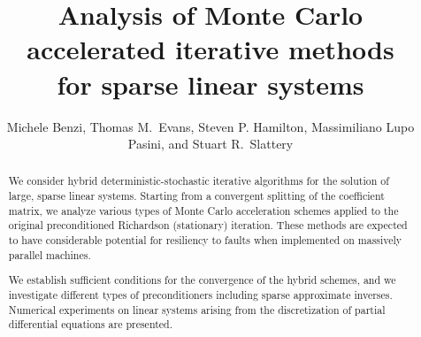 \documentclass[times]{nlaauth}
\begin{document}

\title{Analysis of Monte Carlo accelerated iterative methods\\ for
sparse linear systems}

\author{Michele Benzi, Thomas M.~Evans, Steven P. Hamilton,
\linebreak Massimiliano Lupo  Pasini, and Stuart R.~Slattery
}

\address{Department of Mathematics and Computer
Science, Emory University, Atlanta, Georgia 30322, USA (benzi@mathcs.emory.edu).\break
{}Oak Ridge National Laboratory, 1 Bethel Valley Rd.,
Oak Ridge, TN 37831, USA (evanstm@ornl.gov).\break
{}Oak Ridge National Laboratory, 1 Bethel Valley Rd.,
Oak Ridge, TN 37831, USA (hamiltonsp@ornl.gov).\break
{}Department of Mathematics and Computer
Science, Emory University, Atlanta, Georgia 30322, USA (mlupopa@emory.edu).\break
{}Oak Ridge National Laboratory, 1 Bethel Valley Rd.,
Oak Ridge, TN 37831, USA (slatterysr@ornl.gov).}



\pagestyle{myheadings}

\begin{abstract}
We consider hybrid deterministic-stochastic iterative algorithms for the solution
of large, sparse linear systems. Starting from a convergent splitting of the
coefficient matrix, we analyze various types of Monte Carlo acceleration schemes
applied to the original preconditioned Richardson (stationary) iteration. These
methods are expected to have considerable potential for resiliency to faults
when implemented on massively parallel machines.

We establish sufficient conditions for the convergence of the hybrid schemes, and
we investigate different types of preconditioners including sparse approximate
inverses. Numerical experiments on linear systems arising from the discretization
of partial differential equations are presented.
\end{abstract}
\end{document}
